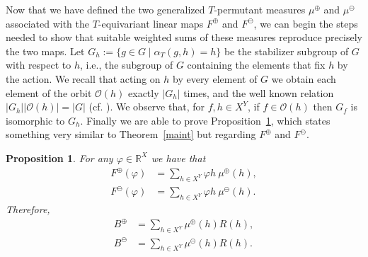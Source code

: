 \documentclass[11pt]{article}
\newcommand{\R}{\mathbb{R}}
\newtheorem{proposition}[theorem]{Proposition}
\begin{document}
Now that we have defined the two generalized $T$-permutant measures
$\mu^\oplus$ and $\mu^\ominus$ associated with the $T$-equivariant linear maps
$F^\oplus$ and $F^\ominus$, we can begin the steps needed to show that suitable
weighted sums of these measures reproduce precisely the two maps. 
Let $G_h:=\{g \in G \mid \alpha_T(g,h)=h\}$ be the stabilizer subgroup of $G$ with respect to $h$, i.e., the subgroup of $G$ containing the elements that fix $h$ by the action. We recall that acting on $h$ by every element of $G$ we obtain each element of the orbit $\mathcal{O}(h)$ exactly $\left|G_h\right|$ times, and the well known relation $\left|G_h\right|\left|\mathcal{O}(h)\right| = \left|G\right|$ (cf. \cite{aschbacher_2000}). We observe that, for $f, h \in X^Y$, if $f \in \mathcal{O}(h)$ then $G_f$ is isomorphic to $G_h$. Finally we are able to prove Proposition~\ref{carperm+-}, which states something very similar to Theorem~\ref{maint} but regarding $F^\oplus$ and $F^\ominus$.

\begin{proposition} 
    \label{carperm+-}
    For any $\varphi \in \R^X$ we have that
    \begin{align*}
        F^\oplus(\varphi) & = \sum_{h \in X^Y} \varphi h \ \mu^\oplus(h), \\
        F^\ominus(\varphi) & = \sum_{h \in X^Y} \varphi h \ \mu^\ominus(h).
    \end{align*}
Therefore,
 \begin{align*}
        B^\oplus & = \sum_{h \in X^Y} \mu^\oplus(h) R(h), \\
        B^\ominus & = \sum_{h \in X^Y} \mu^\ominus(h)R(h).
    \end{align*}
\end{proposition}
\end{document}
